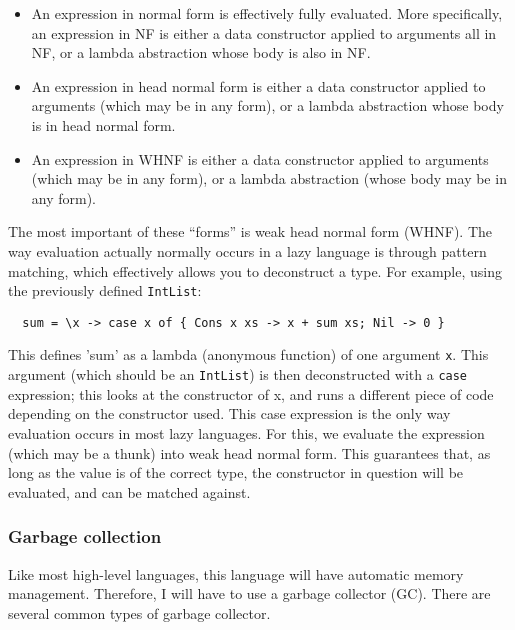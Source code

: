 \documentclass[9pt]{extarticle}
\begin{document}
\begin{itemize}

  \item An expression in normal form is effectively fully evaluated. More
  specifically, an expression in NF is either a data constructor applied to
  arguments all in NF, or a lambda abstraction whose body is also in NF.

  \item An expression in head normal form is either a data constructor applied to
  arguments (which may be in any form), or a lambda abstraction whose body is
  in head normal form.

  \item An expression in WHNF is either a data constructor applied to arguments
  (which may be in any form), or a lambda abstraction (whose body may be in
  any form).

\end{itemize}

The most important of these ``forms'' is weak head normal form (WHNF).
The way evaluation actually normally occurs in a lazy language is
through pattern matching, which effectively allows you to deconstruct a
type. For example, using the previously defined \verb'IntList':

\begin{verbatim}
  sum = \x -> case x of { Cons x xs -> x + sum xs; Nil -> 0 }
\end{verbatim}

This defines 'sum' as a lambda (anonymous function) of one argument
\verb'x'.  This argument (which should be an \verb'IntList') is then
deconstructed with a \verb'case' expression; this looks at the
constructor of x, and runs a different piece of code depending on the
constructor used. This case expression is the only way evaluation occurs
in most lazy languages. For this, we evaluate the expression (which may
be a thunk) into weak head normal form. This guarantees that, as long as
the value is of the correct type, the constructor in question will be
evaluated, and can be matched against.

\subsubsection{Garbage collection}

Like most high-level languages, this language will have automatic memory
management. Therefore, I will have to use a garbage collector (GC).
There are several common types of garbage collector.
\end{document}
